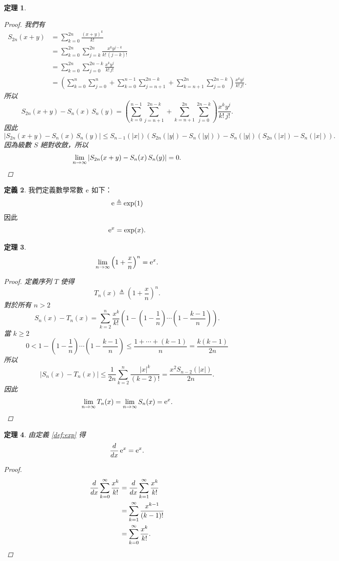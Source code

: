 \documentclass[a4paper]{article}
\newcommand  {\e}{\textup e}
\theoremstyle{plain}
\newtheorem{theorem}{定理}
\theoremstyle{definition}
\newtheorem{definition}[theorem]{定義}
\theoremstyle{remark}
\begin{document}
\begin{CJK}{UTF8}{bsmi}
\begin{theorem}
  \begin{proof}
    我們有
    \begin{align*}
      S_{2n}(x+y) &= \sum_{k=0}^{2n} \frac{(x+y)^k}{k!}\\
	&= \sum_{k=0}^{2n} \sum_{j=k}^{2n} \frac{x^k y^{j-k}}{k!\,(j-k)!}\\
	&= \sum_{k=0}^{2n} \sum_{j=0}^{2n-k} \frac{x^k y^j}{k!\,j!}\\
	&= \left( \sum_{k=0}^n \sum_{j=0}^n + \sum_{k=0}^{n-1} \sum_{j=n+1}^{2n-k} +  \sum_{k=n+1}^{2n} \sum_{j=0}^{2n-k}
	   \right) \frac{x^k y^j}{k!\,j!}.
    \end{align*}
    所以
    \[S_{2n}(x+y) - S_n(x)\,S_n(y) = \left( \sum_{k=0}^{n-1} \sum_{j=n+1}^{2n-k} +  \sum_{k=n+1}^{2n} \sum_{j=0}^{2n-k}
      \right) \frac{x^k y^j}{k!\,j!}.\]
    因此
    \[|S_{2n}(x+y) - S_n(x)\,S_n(y)| \le S_{n-1}(|x|) \left( S_{2n}(|y|) - S_n(|y|) \right) - S_n(|y|) \left( S_{2n}(|x|)
      - S_n(|x|) \right).\]
    因為級數 $S$ 絕對收斂，所以
    \[\lim_{n \to \infty} |S_{2n}(x+y) - S_n(x)\,S_n(y)| = 0. \qedhere\]
  \end{proof}
\end{theorem}

\begin{definition}
  我們定義數學常數 $\e$ 如下：
  \[\e \triangleq \exp(1)\]
  因此
  \[\e^x = \exp(x).\]
\end{definition}

\begin{theorem} \label{th:exp}
  \[\lim_{n \to \infty} \left( 1 + \frac x n \right)^n = \e^x.\]
  \begin{proof}
    定義序列 $T$ 使得
    \[T_n(x) \triangleq \left( 1 + \frac x n \right)^n.\]
    對於所有 $n > 2$
    \[S_n(x) - T_n(x) = \sum_{k=2}^n \frac{x^k}{k!} \left( 1 - \left( 1 - \frac1n \right) \cdots \left( 1 - \frac{k-1}{n}
      \right) \right).\]
    當 $k \ge 2$
    \[0 < 1 - \left( 1 - \frac1n \right) \cdots \left( 1 - \frac{k-1}{n} \right) \le \frac{1 + \cdots + (k-1)}{n} = \frac{k
      \left( k-1 \right)}{2n}\]
    所以
    \[|S_n(x) - T_n(x)| \le \frac{1}{2n} \sum_{k=2}^n \frac{|x|^k}{(k-2)!} = \frac{x^2 S_{n-2}(|x|)}{2n}.\]
    因此
    \[\lim_{n \to \infty} T_n(x) = \lim_{n \to \infty} S_n(x) = \e^x. \qedhere\]
  \end{proof}
\end{theorem}

\begin{theorem}
  由定義 \ref{def:exp} 得
  \[\frac{d}{dx}\,\e^x = \e^x.\]
  \begin{proof}
    \begin{align*}
      \frac{d}{dx} \sum_{k=0}^{\infty} \frac{x^k}{k!} &= \frac{d}{dx} \sum_{k=1}^{\infty} \frac{x^k}{k!}\\
	&= \sum_{k=1}^{\infty} \frac{x^{k-1}}{(k-1)!}\\
	&= \sum_{k=0}^{\infty} \frac{x^k}{k!}. \qedhere
    \end{align*}
  \end{proof}
\end{theorem}


\end{CJK}
\end{document}
